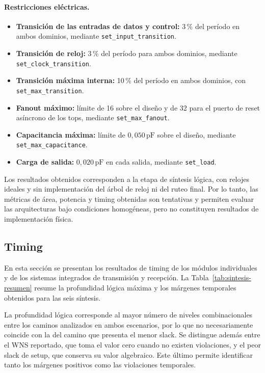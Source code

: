 \documentclass[10pt,a4paper]{article}
\begin{document}
\paragraph{Restricciones eléctricas.}
\begin{itemize}
    \item \textbf{Transición de las entradas de datos y control:}
    3\,\% del período en ambos dominios, mediante
    \texttt{set\_input\_transition}.

    \item \textbf{Transición de reloj:}
    3\,\% del período para ambos dominios, mediante
    \texttt{set\_clock\_transition}.

    \item \textbf{Transición máxima interna:}
    10\,\% del período en ambos dominios, con
    \texttt{set\_max\_transition}.

    \item \textbf{Fanout máximo:}
    límite de 16 sobre el diseño y de 32 para el puerto de reset
    asíncrono de los tops, mediante \texttt{set\_max\_fanout}.

    \item \textbf{Capacitancia máxima:}
    límite de $0{,}050\,\mathrm{pF}$ sobre el diseño, mediante 
    \texttt{set\_max\_capacitance}.

    \item \textbf{Carga de salida:}
    $0{,}020\,\mathrm{pF}$ en cada salida, mediante
    \texttt{set\_load}.
\end{itemize}

Los resultados obtenidos corresponden a la etapa de síntesis 
lógica, con relojes ideales y sin implementación del árbol 
de reloj ni del ruteo final. Por lo tanto, las métricas de 
área, potencia y timing obtenidas son tentativas y permiten 
evaluar las arquitecturas bajo condiciones homogéneas, pero 
no constituyen resultados de implementación física.

\subsection{Timing}

En esta sección se presentan los resultados de timing de los 
módulos individuales y de los sistemas integrados de transmisión 
y recepción. La Tabla~\ref{tab:sintesis-resumen} resume la 
profundidad lógica máxima y los márgenes temporales 
obtenidos para las seis síntesis.

La profundidad lógica corresponde al mayor número de niveles
combinacionales entre los caminos analizados en ambos escenarios,
por lo que no necesariamente coincide con la del camino que
presenta el menor slack. Se distingue además entre el WNS
reportado, que toma el valor cero cuando no existen violaciones,
y el peor slack de setup, que conserva su valor algebraico.
Este último permite identificar tanto los márgenes positivos
como las violaciones temporales.
\end{document}

